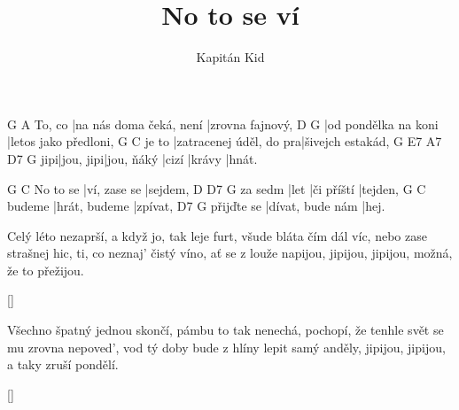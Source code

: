 \documentclass{song}
\title{No to se ví}
\author{Kapitán Kid}
\begin{document}
\strophe
       G                       A
To, co |na nás doma čeká, není |zrovna fajnový,
D                    G
|od pondělka na koni |letos jako předloni,
      G                       C
je to |zatracenej úděl, do pra|šivejch estakád,
    G         E7         A7    D7     G
jipi|jou, jipi|jou, ňáký |cizí |krávy |hnát.
\endstrophe

         G            C
No to se |ví, zase se |sejdem,
        D    D7         G
za sedm |let |či příští |tejden,
       G             C
budeme |hrát, budeme |zpívat,
           D7               G
přijďte se |dívat, bude nám |hej.
\endstrophe

\strophe*
Celý léto nezaprší, a když jo, tak leje furt,
všude bláta čím dál víc, nebo zase strašnej hic,
ti, co neznaj' čistý víno, ať se z louže napijou,
jipijou, jipijou, možná, že to přežijou.
\endstrophe

\ref{}

\strophe*
Všechno špatný jednou skončí, pámbu to tak nenechá,
pochopí, že tenhle svět se mu zrovna nepoved',
vod tý doby bude z hlíny lepit samý anděly,
jipijou, jipijou, a taky zruší pondělí.
\endstrophe

\ref{}
\end{document}
